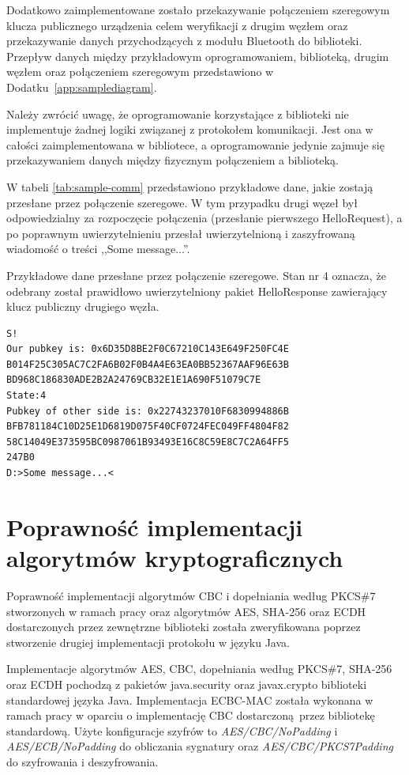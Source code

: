 Dodatkowo zaimplementowane zostało przekazywanie połączeniem szeregowym klucza publicznego urządzenia celem weryfikacji z drugim węzłem oraz przekazywanie danych przychodzących z modułu Bluetooth do biblioteki. Przepływ danych między przykładowym oprogramowaniem, biblioteką, drugim węzłem oraz połączeniem szeregowym przedstawiono w Dodatku~\ref{app:samplediagram}.

Należy zwrócić uwagę, że oprogramowanie korzystające z biblioteki nie implementuje żadnej logiki związanej z protokołem komunikacji. Jest ona w całości zaimplementowana w bibliotece, a oprogramowanie jedynie zajmuje się przekazywaniem danych między fizycznym połączeniem a biblioteką.

W tabeli \ref{tab:sample-comm} przedstawiono przykładowe dane, jakie zostają przesłane przez połączenie szeregowe. W tym przypadku drugi węzeł był odpowiedzialny za rozpoczęcie połączenia (przesłanie pierwszego HelloRequest), a po poprawnym uwierzytelnieniu przesłał uwierzytelnioną i zaszyfrowaną wiadomość o treści ,,Some message...''.

\begin{table}
\centering
\caption{Przykładowe dane przesłane przez połączenie szeregowe. Stan nr 4 oznacza, że odebrany został prawidłowo uwierzytelniony pakiet HelloResponse zawierający klucz publiczny drugiego węzła.}
\begin{BVerbatim}
S!
Our pubkey is: 0x6D35D8BE2F0C67210C143E649F250FC4E
B014F25C305AC7C2FA6B02F0B4A4E63EA0BB52367AAF96E63B
BD968C186830ADE2B2A24769CB32E1E1A690F51079C7E
State:4
Pubkey of other side is: 0x22743237010F6830994886B
BFB781184C10D25E1D6819D075F40CF0724FEC049FF4804F82
58C14049E373595BC0987061B93493E16C8C59E8C7C2A64FF5
247B0
D:>Some message...<
\end{BVerbatim}
\label{tab:sample-comm}
\end{table}

\section{Poprawność implementacji algorytmów kryptograficznych}

Poprawność implementacji algorytmów CBC i dopełniania według PKCS\#7 stworzonych w ramach pracy oraz algorytmów AES, SHA-256 oraz ECDH dostarczonych przez zewnętrzne biblioteki została zweryfikowana poprzez stworzenie drugiej implementacji protokołu w języku Java.

Implementacje algorytmów AES, CBC, dopełniania według PKCS\#7, SHA-256 oraz ECDH pochodzą z pakietów java.security oraz javax.crypto biblioteki standardowej języka Java. Implementacja ECBC-MAC została wykonana w ramach pracy w oparciu o implementację CBC dostarczoną przez bibliotekę standardową. Użyte konfiguracje szyfrów to \emph{AES/CBC/NoPadding} i \emph{AES/ECB/NoPadding} do obliczania sygnatury oraz \emph{AES/CBC/PKCS7Padding} do szyfrowania i deszyfrowania.

